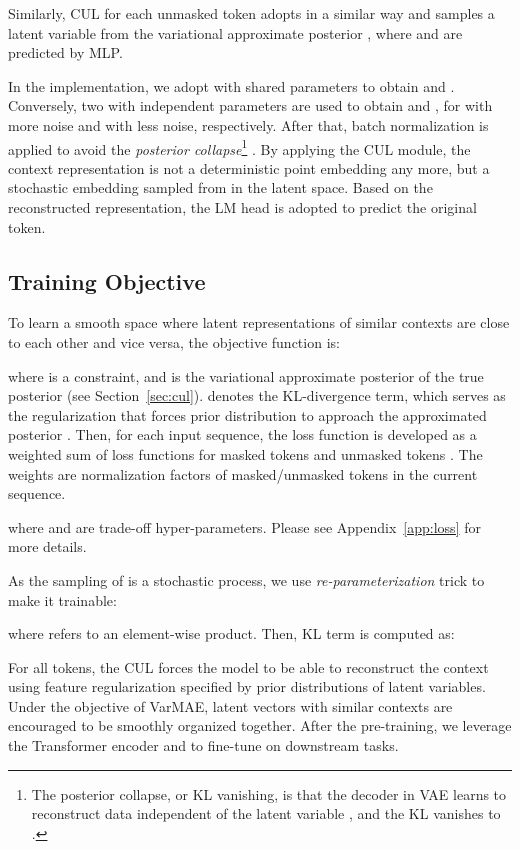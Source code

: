 \documentclass[11pt]{article}
\begin{document}
Similarly, CUL for each unmasked token  adopts in a similar way and samples a latent variable  from the variational approximate posterior ,  where  and   are predicted by MLP.


In the implementation, we adopt  with shared parameters to obtain  and .
Conversely, two  with independent parameters are used to obtain 
 and , for  with more noise and  with less noise, respectively.
After that, batch normalization \cite{DBLP:conf/icml/IoffeS15} is applied to avoid the \textit{posterior collapse}\footnote{The posterior collapse, or KL vanishing, is that the decoder in VAE learns to reconstruct data independent of the latent variable , and the KL vanishes to .} \cite{DBLP:conf/acl/ZhuBLMLW20}.
By applying the CUL module, the context representation is not a deterministic point embedding any more, but a stochastic embedding sampled from  in the latent space.
Based on the reconstructed representation, the LM head is adopted to predict the original token.



\subsection{Training Objective}
To learn a smooth space where latent representations of similar contexts are close to each other and vice versa, the objective function is:

where  is a constraint, and 
 is the variational approximate posterior of the true posterior  (see Section~\ref{sec:cul}).
 denotes the KL-divergence term, which serves as the regularization that forces prior distribution  to approach the approximated posterior .
Then, for each input sequence, the loss function is developed as a weighted sum of loss functions for masked tokens  and unmasked tokens .
The weights are normalization factors of masked/unmasked tokens in the current sequence. 

where  and  are trade-off hyper-parameters.
Please see Appendix~\ref{app:loss} for more details.

As the sampling of  is a stochastic process, we use  \textit{re-parameterization} trick \cite{DBLP:journals/corr/KingmaW13} to make it trainable:
    
where  refers to an element-wise product.
Then, KL term    is computed as:



For all tokens, the CUL forces the model to be able to reconstruct the context using feature regularization specified by prior distributions of latent variables.
Under the objective of VarMAE, latent vectors with similar contexts are encouraged to be smoothly organized together.
After the pre-training, we leverage the Transformer encoder and  to fine-tune on downstream tasks.
\end{document}
